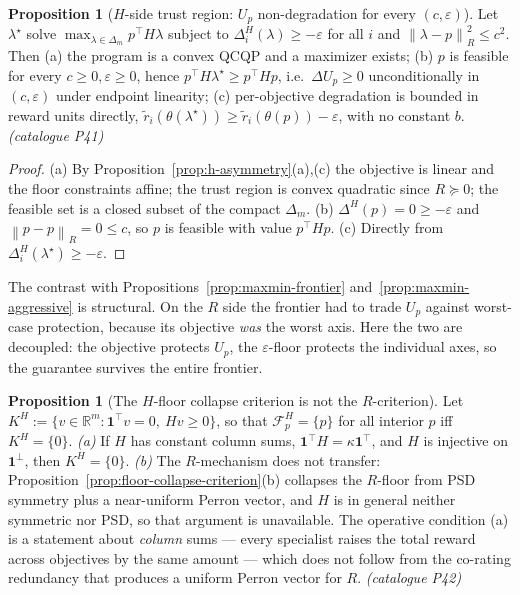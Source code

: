 \documentclass[12pt,a4paper]{report}
\newcommand{\R}{\mathbb{R}}
\newcommand{\1}{\mathbf{1}}
\newcommand{\norm}[1]{\left\lVert #1 \right\rVert}
\newcommand{\Floor}{\mathcal{F}_{p}}
\theoremstyle{definition}
\newtheorem{proposition}[definition]{Proposition}
\begin{document}
\begin{proposition}[\(H\)-side trust region: \(U_p\) non-degradation for every \((c,\varepsilon)\)]
\label{prop:h-nondeg}
Let \(\lambda^\star\) solve \(\max_{\lambda\in\Delta_m}p^\top H\lambda\) subject to \(\Delta^H_i(\lambda)\ge-\varepsilon\) for all \(i\) and \(\norm{\lambda-p}_R^2\le c^2\). Then (a) the program is a convex QCQP and a maximizer exists; (b) \(p\) is feasible for every \(c\ge0,\varepsilon\ge0\), hence \(p^\top H\lambda^\star\ge p^\top Hp\), i.e.\ \(\Delta U_p\ge0\) unconditionally in \((c,\varepsilon)\) under endpoint linearity; (c) per-objective degradation is bounded in reward units directly, \(\tilde r_i(\theta(\lambda^\star))\ge\tilde r_i(\theta(p))-\varepsilon\), with no constant \(b\). \emph{(catalogue P41)}
\end{proposition}

\begin{proof}
(a) By Proposition~\ref{prop:h-asymmetry}(a),(c) the objective is linear and the floor constraints affine; the trust region is convex quadratic since \(R\succeq0\); the feasible set is a closed subset of the compact \(\Delta_m\). (b) \(\Delta^H(p)=0\ge-\varepsilon\) and \(\norm{p-p}_R=0\le c\), so \(p\) is feasible with value \(p^\top Hp\). (c) Directly from \(\Delta^H_i(\lambda^\star)\ge-\varepsilon\).
\end{proof}

The contrast with Propositions~\ref{prop:maxmin-frontier} and~\ref{prop:maxmin-aggressive} is structural. On the \(R\) side the frontier had to trade \(U_p\) against worst-case protection, because its objective \emph{was} the worst axis. Here the two are decoupled: the objective protects \(U_p\), the \(\varepsilon\)-floor protects the individual axes, so the guarantee survives the entire frontier.

\begin{proposition}[The \(H\)-floor collapse criterion is not the \(R\)-criterion]
\label{prop:h-floor-collapse}
Let \(K^H:=\{v\in\R^m:\1^\top v=0,\ Hv\ge0\}\), so that \(\Floor^H=\{p\}\) for all interior \(p\) iff \(K^H=\{0\}\). \emph{(a)} If \(H\) has constant column sums, \(\1^\top H=\kappa\1^\top\), and \(H\) is injective on \(\1^\perp\), then \(K^H=\{0\}\). \emph{(b)} The \(R\)-mechanism does not transfer: Proposition~\ref{prop:floor-collapse-criterion}(b) collapses the \(R\)-floor from PSD symmetry plus a near-uniform Perron vector, and \(H\) is in general neither symmetric nor PSD, so that argument is unavailable. The operative condition (a) is a statement about \emph{column} sums --- every specialist raises the total reward across objectives by the same amount --- which does not follow from the co-rating redundancy that produces a uniform Perron vector for \(R\). \emph{(catalogue P42)}
\end{proposition}
\end{document}
